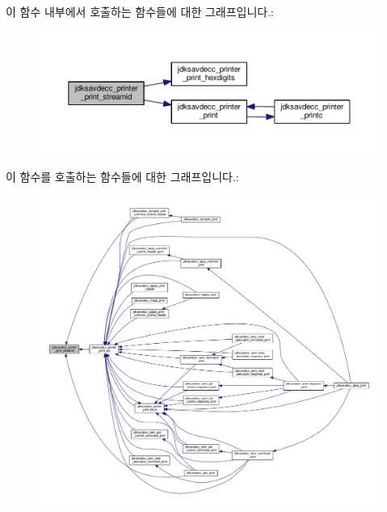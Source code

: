 이 함수 내부에서 호출하는 함수들에 대한 그래프입니다.\+:
\nopagebreak
\begin{figure}[H]
\begin{center}
\leavevmode
\includegraphics[width=350pt]{group__util_ga8439b1cdb450c02010bc8318643f67a2_cgraph}
\end{center}
\end{figure}




이 함수를 호출하는 함수들에 대한 그래프입니다.\+:
\nopagebreak
\begin{figure}[H]
\begin{center}
\leavevmode
\includegraphics[width=350pt]{group__util_ga8439b1cdb450c02010bc8318643f67a2_icgraph}
\end{center}
\end{figure}


